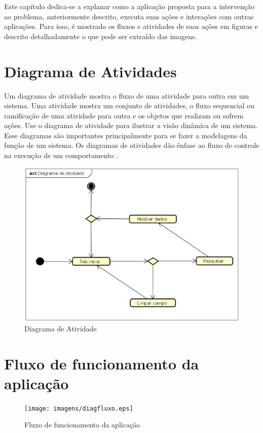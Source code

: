 Este capítulo dedica-se a explanar como a aplicação proposta para a intervenção ao problema, anteriormente descrito, executa suas ações e interações com outras aplicações. Para isso, é mostrado os fluxos e atividades de suas ações em figuras e descrito detalhadamente o que pode ser extraído das imagens.

\section{Diagrama de Atividades}
Um diagrama de atividade mostra o fluxo de uma atividade para outra em um sistema. Uma atividade mostra um conjunto de atividades, o fluxo sequencial ou ramificação de uma atividade para outra e os objetos que realizam ou sofrem ações. Use o diagrama de atividade para ilustrar a visão dinâmica de um sistema. Esse diagramas são importantes principalmente para se fazer a modelagens da função de um sistema. Os diagramas de atividades dão ênfase ao fluxo de controle na execução de um comportamento \cite{Booch:2012}.

\begin{figure}[!htb]
        \caption{\label{diagrama1}Diagrama de Atividade}
        \begin{center}
                \includegraphics[width=\textwidth]{imagens/diagact.eps}
        \end{center}
\end{figure}

\section{Fluxo de funcionamento da aplicação}

\begin{figure}[!htb]
        \caption{\label{diagrama1}Fluxo de funcionamento da aplicação}
        \begin{center}
                \texttt{[image: imagens/diagfluxo.eps]}
        \end{center}
\end{figure}
